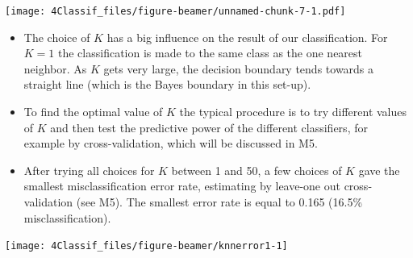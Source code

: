 \documentclass[10pt,ignorenonframetext,]{beamer}
\begin{document}
\begin{frame}

\texttt{[image: 4Classif\_files/figure-beamer/unnamed-chunk-7-1.pdf]}

\end{frame}

\begin{frame}

\begin{itemize}
\item
  The choice of \(K\) has a big influence on the result of our
  classification. For \(K=1\) the classification is made to the same
  class as the one nearest neighbor. As \(K\) gets very large, the
  decision boundary tends towards a straight line (which is the Bayes
  boundary in this set-up).
\item
  To find the optimal value of \(K\) the typical procedure is to try
  different values of \(K\) and then test the predictive power of the
  different classifiers, for example by cross-validation, which will be
  discussed in M5.
\item
  After trying all choices for \(K\) between 1 and 50, a few choices of
  \(K\) gave the smallest misclassification error rate, estimating by
  leave-one out cross-validation (see M5). The smallest error rate is
  equal to 0.165 (16.5\% misclassification).
\end{itemize}

\end{frame}

\begin{frame}

\begin{center}\texttt{[image: 4Classif\_files/figure-beamer/knnerror1-1]} \end{center}

\end{frame}
\end{document}
